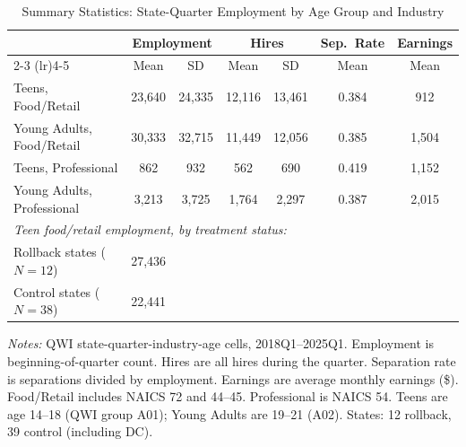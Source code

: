 \begin{table}[htbp]
\centering
\caption{Summary Statistics: State-Quarter Employment by Age Group and Industry}
\label{tab:sumstats}
\begin{threeparttable}
\begin{tabular}{lcccccc}
\toprule
 & \multicolumn{2}{c}{Employment} & \multicolumn{2}{c}{Hires} & Sep.\ Rate & Earnings \\
\cmidrule(lr){2-3} \cmidrule(lr){4-5}
 & Mean & SD & Mean & SD & Mean & Mean \\
\midrule
Teens, Food/Retail & 23,640 & 24,335 & 12,116 & 13,461 & 0.384 & 912 \\
Young Adults, Food/Retail & 30,333 & 32,715 & 11,449 & 12,056 & 0.385 & 1,504 \\
Teens, Professional & 862 & 932 & 562 & 690 & 0.419 & 1,152 \\
Young Adults, Professional & 3,213 & 3,725 & 1,764 & 2,297 & 0.387 & 2,015 \\
\midrule
\multicolumn{7}{l}{\textit{Teen food/retail employment, by treatment status:}} \\
Rollback states ($N = 12$) & 27,436 & & & & & \\
Control states ($N = 38$) & 22,441 & & & & & \\
\bottomrule
\end{tabular}
\begin{tablenotes}[flushleft]\small
\item \textit{Notes:} QWI state-quarter-industry-age cells, 2018Q1--2025Q1. Employment is beginning-of-quarter count. Hires are all hires during the quarter. Separation rate is separations divided by employment. Earnings are average monthly earnings (\$). Food/Retail includes NAICS 72 and 44--45. Professional is NAICS 54. Teens are age 14--18 (QWI group A01); Young Adults are 19--21 (A02). States: 12 rollback, 39 control (including DC).
\end{tablenotes}
\end{threeparttable}
\end{table}

